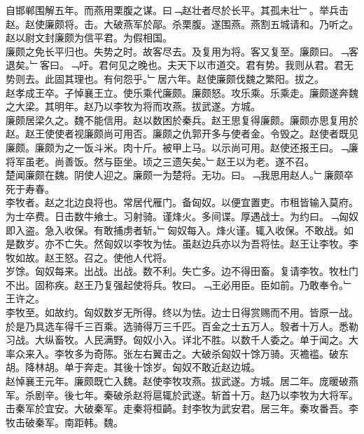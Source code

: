 \documentclass{zhvt-classic}
\begin{document}
\hspace*{2em}自邯郸围解五年。而燕用栗腹之谋。曰﹁赵壮者尽於长平。其孤未壮﹂。举兵击赵。赵使廉颇将。击。大破燕军於鄗。杀栗腹。遂围燕。燕割五城请和。乃听之。赵以尉文封廉颇为信平君。为假相国。\\
\hspace*{2em}廉颇之免长平归也。失势之时。故客尽去。及复用为将。客又复至。廉颇曰。﹁客退矣。﹂客曰。﹁吁。君何见之晚也。夫天下以市道交。君有势。我则从君。君无势则去。此固其理也。有何怨乎。﹂居六年。赵使廉颇伐魏之繁阳。拔之。\\
\hspace*{2em}赵孝成王卒。子悼襄王立。使乐乘代廉颇。廉颇怒。攻乐乘。乐乘走。廉颇遂奔魏之大梁。其明年。赵乃以李牧为将而攻燕。拔武遂。方城。\\
\hspace*{2em}廉颇居梁久之。魏不能信用。赵以数困於秦兵。赵王思复得廉颇。廉颇亦思复用於赵。赵王使使者视廉颇尚可用否。廉颇之仇郭开多与使者金。令毁之。赵使者既见廉颇。廉颇为之一饭斗米。肉十斤。被甲上马。以示尚可用。赵使还报王曰。﹁廉将军虽老。尚善饭。然与臣坐。顷之三遗矢矣。﹂赵王以为老。遂不召。\\
\hspace*{2em}楚闻廉颇在魏。阴使人迎之。廉颇一为楚将。无功。曰。﹁我思用赵人。﹂廉颇卒死于寿春。\\
\hspace*{2em}李牧者。赵之北边良将也。常居代雁门。备匈奴。以便宜置吏。市租皆输入莫府。为士卒费。日击数牛飨士。习射骑。谨烽火。多间谍。厚遇战士。为约曰。﹁匈奴即入盗。急入收保。有敢捕虏者斩。﹂匈奴每入。烽火谨。辄入收保。不敢战。如是数岁。亦不亡失。然匈奴以李牧为怯。虽赵边兵亦以为吾将怯。赵王让李牧。李牧如故。赵王怒。召之。使他人代将。\\
\hspace*{2em}岁馀。匈奴每来。出战。出战。数不利。失亡多。边不得田畜。复请李牧。牧杜门不出。固称疾。赵王乃复强起使将兵。牧曰。﹁王必用臣。臣如前。乃敢奉令。﹂王许之。\\
\hspace*{2em}李牧至。如故约。匈奴数岁无所得。终以为怯。边士日得赏赐而不用。皆原一战。於是乃具选车得千三百乘。选骑得万三千匹。百金之士五万人。彀者十万人。悉勒习战。大纵畜牧。人民满野。匈奴小入。详北不胜。以数千人委之。单于闻之。大率众来入。李牧多为奇陈。张左右翼击之。大破杀匈奴十馀万骑。灭襜褴。破东胡。降林胡。单于奔走。其後十馀岁。匈奴不敢近赵边城。\\
\hspace*{2em}赵悼襄王元年。廉颇既亡入魏。赵使李牧攻燕。拔武遂。方城。居二年。庞暖破燕军。杀剧辛。後七年。秦破杀赵将扈辄於武遂。斩首十万。赵乃以李牧为大将军。击秦军於宜安。大破秦军。走秦将桓齮。封李牧为武安君。居三年。秦攻番吾。李牧击破秦军。南距韩。魏。\\
\end{document}

